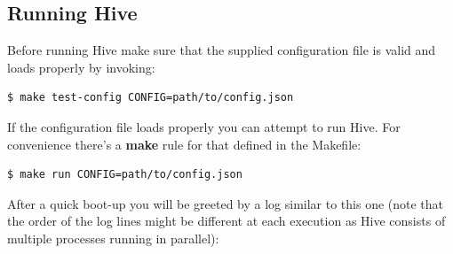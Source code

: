 \documentclass[a4paper]{article}
\begin{document}
\subsection{Running Hive}
\label{sec-2-3}

Before running Hive make sure that the supplied configuration file is valid and loads properly by invoking:


\begin{verbatim}
$ make test-config CONFIG=path/to/config.json
\end{verbatim}



\noindent
If the configuration file loads properly you can attempt to run Hive. For convenience there's a \textbf{make} rule for that defined in the Makefile:


\begin{verbatim}
$ make run CONFIG=path/to/config.json
\end{verbatim}



\noindent
After a quick boot-up you will be greeted by a log similar to this one (note that the order of the log lines might be different at each execution as Hive consists of multiple processes running in parallel):
\end{document}
